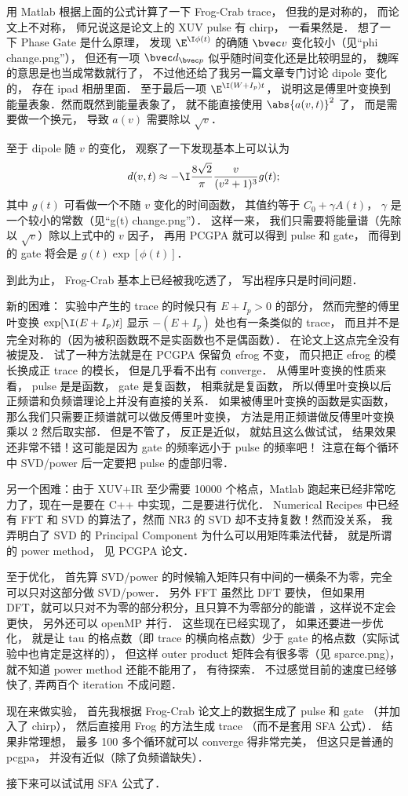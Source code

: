 用 Matlab 根据上面的公式计算了一下 Frog-Crab trace， 但我的是对称的， 而论文上不对称， 师兄说这是论文上的 XUV pulse 有 chirp， 一看果然是． 想了一下 Phase Gate 是什么原理， 发现 $\E^{\I\phi(t)}$ 的确随 $\bvec v$ 变化较小（见“phi change.png”）， 但还有一项 $\bvec d_{\bvec p}$ 似乎随时间变化还是比较明显的， 魏晖的意思是也当成常数就行了， 不过他还给了我另一篇文章专门讨论 dipole 变化的， 存在 ipad 相册里面． 至于最后一项 $\E^{\I(W+I_p)t}$， 说明这是傅里叶变换到能量表象．然而既然到能量表象了， 就不能直接使用 $\abs{a(v, t)}^2$ 了， 而是需要做一个换元， 导致 $a(v)$ 需要除以 $\sqrt{v}$．

至于 dipole 随 $v$ 的变化， 观察了一下发现基本上可以认为
\begin{equation}
d(v, t) \approx -\I \frac{8\sqrt2}{\pi} \frac{v}{(v^2+1)^3} g(t);
\end{equation}
其中 $g(t)$ 可看做一个不随 $v$ 变化的时间函数， 其值约等于 $C_0 + \gamma A(t)$， $\gamma$ 是一个较小的常数（见“g(t) change.png”）． 这样一来， 我们只需要将能量谱（先除以 $\sqrt{v}$）除以上式中的 $v$ 因子， 再用 PCGPA 就可以得到 pulse 和 gate， 而得到的 gate 将会是 $g(t)\exp[\phi(t)]$．

到此为止， Frog-Crab 基本上已经被我吃透了， 写出程序只是时间问题．

新的困难： 实验中产生的 trace 的时候只有 $E + I_p > 0$ 的部分， 然而完整的傅里叶变换  $\exp[\I (E + I_p) t]$ 显示 $-(E + I_p)$ 处也有一条类似的 trace， 而且并不是完全对称的（因为被积函数既不是实函数也不是偶函数）． 在论文上这点完全没有被提及． 试了一种方法就是在 PCGPA 保留负 efrog 不变， 而只把正 efrog 的模长换成正 trace 的模长， 但是几乎看不出有 converge． 从傅里叶变换的性质来看， pulse 是是函数， gate 是复函数， 相乘就是复函数， 所以傅里叶变换以后正频谱和负频谱理论上并没有直接的关系． 如果被傅里叶变换的函数是实函数， 那么我们只需要正频谱就可以做反傅里叶变换， 方法是用正频谱做反傅里叶变换乘以 2 然后取实部． 但是不管了， 反正是近似， 就姑且这么做试试， 结果效果还非常不错！这可能是因为 gate 的频率远小于 pulse 的频率吧！ 注意在每个循环中 SVD/power 后一定要把 pulse 的虚部归零．

另一个困难：由于 XUV+IR 至少需要 10000 个格点，Matlab 跑起来已经非常吃力了，现在一是要在 C++ 中实现，二是要进行优化． Numerical Recipes 中已经有 FFT 和 SVD 的算法了，然而 NR3 的 SVD 却不支持复数！然而没关系， 我弄明白了 SVD 的 Principal Component 为什么可以用矩阵乘法代替， 就是所谓的 power method， 见 PCGPA 论文．

至于优化， 首先算 SVD/power 的时候输入矩阵只有中间的一横条不为零，完全可以只对这部分做 SVD/power． 另外 FFT 虽然比 DFT 要快， 但如果用 DFT，就可以只对不为零的部分积分，且只算不为零部分的能谱 ，这样说不定会更快， 另外还可以 openMP 并行． 这些现在已经实现了， 如果还要进一步优化， 就是让 tau 的格点数（即 trace 的横向格点数）少于 gate 的格点数（实际试验中也肯定是这样的）， 但这样 outer product 矩阵会有很多零（见 sparce.png)， 就不知道 power method 还能不能用了， 有待探索． 不过感觉目前的速度已经够快了, 弄两百个 iteration 不成问题．

现在来做实验， 首先我根据 Frog-Crab 论文上的数据生成了 pulse 和 gate （并加入了 chirp）， 然后直接用 Frog 的方法生成 trace （而不是套用 SFA 公式）． 结果非常理想， 最多 100 多个循环就可以 converge 得非常完美， 但这只是普通的 pcgpa， 并没有近似（除了负频谱缺失）．

接下来可以试试用 SFA 公式了．








